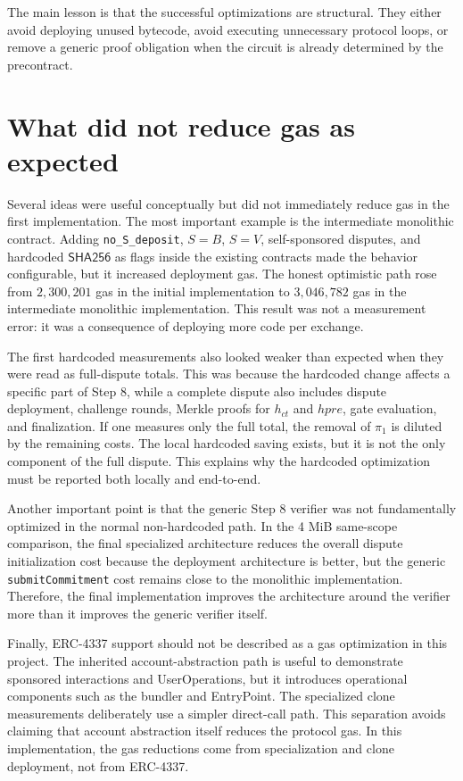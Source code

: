 The main lesson is that the successful optimizations are structural. They either avoid
deploying unused bytecode, avoid executing unnecessary protocol loops, or remove a generic
proof obligation when the circuit is already determined by the precontract.

\section{What did not reduce gas as expected}

Several ideas were useful conceptually but did not immediately reduce gas in the first
implementation. The most important example is the intermediate monolithic contract. Adding
\texttt{no\_S\_deposit}, \(S=B\), \(S=V\), self-sponsored disputes, and hardcoded
\(\mathsf{SHA256}\) as flags inside the existing contracts made the behavior configurable,
but it increased deployment gas. The honest optimistic path rose from \(2,300,201\) gas in
the initial implementation to \(3,046,782\) gas in the intermediate monolithic implementation.
This result was not a measurement error: it was a consequence of deploying more code per
exchange.

The first hardcoded measurements also looked weaker than expected when they were read as
full-dispute totals. This was because the hardcoded change affects a specific part of
Step 8, while a complete dispute also includes dispute deployment, challenge rounds,
Merkle proofs for \(h_{\mathit{ct}}\) and \(hpre\), gate evaluation, and finalization. If
one measures only the full total, the removal of \(\pi_1\) is diluted by the remaining
costs. The local hardcoded saving exists, but it is not the only component of the full
dispute. This explains why the hardcoded optimization must be reported both locally and
end-to-end.

Another important point is that the generic Step 8 verifier was not fundamentally
optimized in the normal non-hardcoded path. In the 4 MiB same-scope comparison, the final
specialized architecture reduces the overall dispute initialization cost because the
deployment architecture is better, but the generic \texttt{submitCommitment} cost remains
close to the monolithic implementation. Therefore, the final implementation improves the
architecture around the verifier more than it improves the generic verifier itself.

Finally, ERC-4337 support should not be described as a gas optimization in this project.
The inherited account-abstraction path is useful to demonstrate sponsored interactions and
UserOperations, but it introduces operational components such as the bundler and
EntryPoint. The specialized clone measurements deliberately use a simpler direct-call path.
This separation avoids claiming that account abstraction itself reduces the protocol gas.
In this implementation, the gas reductions come from specialization and clone deployment,
not from ERC-4337.

